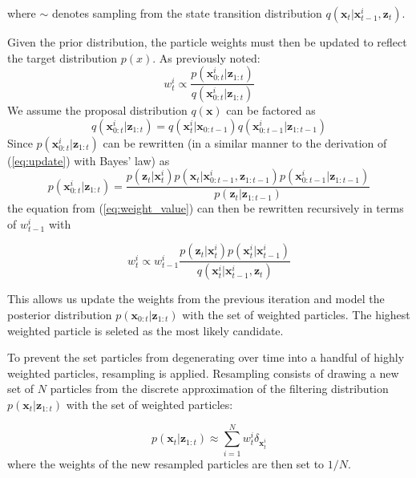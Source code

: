\documentclass[letterpaper, 10 pt, conference]{ieeeconf}
\renewcommand{\vec}[1]{\boldsymbol{#1}}
\renewcommand{\eqref}[1]{\textup{{\normalfont(\ref{#1}}\normalfont)}}
\begin{document}
where $\sim$ denotes sampling from the state transition distribution $q(\vec{x}_t|\vec{x}^i_{t-1}, \vec{z}_t)$.

Given the prior distribution, the particle weights must then be updated to reflect the target distribution $p(x)$. As previously noted:
\begin{equation} \label{eq:weight_value}
	w^i_{t} \propto \frac{p(\vec{x}^i_{0:t}|\vec{z}_{1:t})}{q(\vec{x}^i_{0:t}|\vec{z}_{1:t}) }
\end{equation}
We assume the proposal distribution $q(\vec{x})$ can be factored as
\begin{equation*}
	q(\vec{x}^i_{0:t}|\vec{z}_{1:t}) = q(\vec{x}^i_t|\vec{x}_{0:t-1})q(\vec{x}^i_{0:t-1}|\vec{z}_{1:t-1})
\end{equation*}
Since $p(\vec{x}^i_{0:t}|\vec{z}_{1:t})$ can be rewritten (in a similar manner to the derivation of \eqref{eq:update} with Bayes' law) as
\begin{equation*}
	p(\vec{x}^i_{0:t}|\vec{z}_{1:t}) = 
	\frac{p(\vec{z}_t|\vec{x}^i_t)p(\vec{x}_t|\vec{x}^i_{0:t-1}, \vec{z}_{1:t-1})p(\vec{x}^i_{0:t-1}|\vec{z}_{1:t-1})}{p(\vec{z}_t|\vec{z}_{1:t-1})}
\end{equation*}
the equation from \eqref{eq:weight_value} can then be rewritten recursively in terms of $w^i_{t-1}$ with

\begin{equation} \label{eq:update_weights}
	w^i_t \propto w^i_{t-1} \frac{p(\vec{z}_t|\vec{x}^i_t)p(\vec{x}^i_t|\vec{x}^i_{t-1})}{q(\vec{x}^i_t|\vec{x}^i_{t-1},\vec{z}_t)}
\end{equation}

This allows us update the weights from the previous iteration and model the posterior distribution $p(\vec{x}_{0:t}|\vec{z}_{1:t})$ with the set of weighted particles. The highest weighted particle is seleted as the most likely candidate.

To prevent the set particles from degenerating over time into a handful of highly weighted particles, resampling is applied. Resampling consists of drawing a new set of $N$ particles from the discrete approximation of the filtering distribution $p(\vec{x}_t|\vec{z}_{1:t})$ with the set of weighted particles:

\begin{equation}
	p(\vec{x}_t|\vec{z}_{1:t}) \approx \sum_{i=1}^{N}{w^i_t\delta_{\vec{x}^i_t}}
\end{equation}
where the weights of the new resampled particles are then set to $1/N$.
\end{document}
